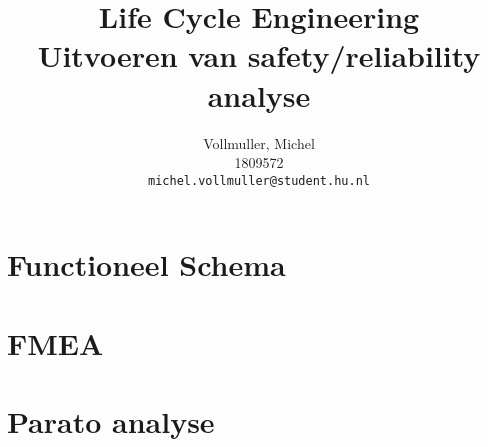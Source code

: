 \documentclass{article}
\title{
    Life Cycle Engineering \\
    \large Uitvoeren van safety/reliability analyse}
\author{
  Vollmuller, Michel\\
  1809572\\
  \texttt{michel.vollmuller@student.hu.nl}
}
\begin{document}
\maketitle


\tableofcontents

\newpage
\section{Functioneel Schema}


\newpage
\section{FMEA}


\newpage
\section{Parato analyse}


% 
% 


\end{document}
